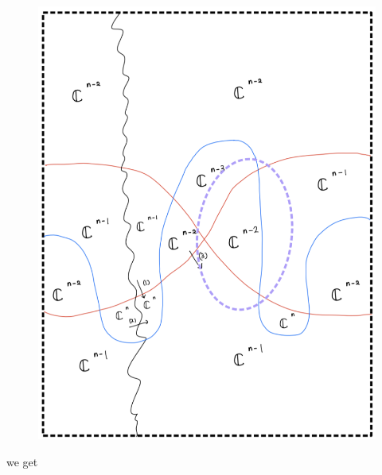 \begin{enumerate}[label=(Step \arabic*)]
\begin{figure}[H]
    \centering
    \includegraphics[scale = 0.95]{diagrams/cobord'8/4.png}
    \caption{}
    \label{fig:your-label}
\end{figure}

we get


\end{enumerate}

